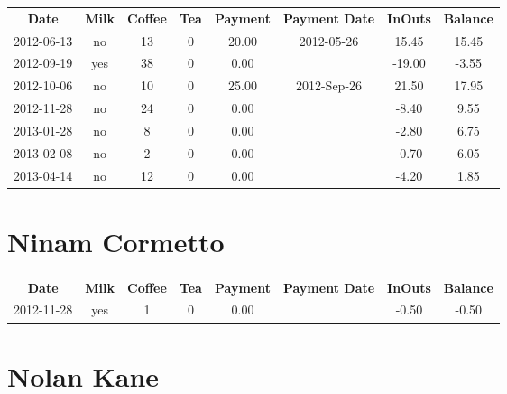 \begin{center}
\begin{tabular}{cccccccc}
\textbf{Date} & \textbf{Milk} & \textbf{Coffee} & \textbf{Tea} & \textbf{Payment} & \textbf{Payment Date} & \textbf{InOuts} & \textbf{Balance} \\
2012-06-13 & no & 13 & 0 & 20.00 & 2012-05-26 &  15.45 & 15.45\\ 
2012-09-19 & yes & 38 & 0 &  0.00 &  & -19.00 & -3.55\\ 
2012-10-06 & no & 10 & 0 & 25.00 & 2012-Sep-26 &  21.50 & 17.95\\ 
2012-11-28 & no & 24 & 0 &  0.00 &  &  -8.40 &  9.55\\ 
2013-01-28 & no &  8 & 0 &  0.00 &  &  -2.80 &  6.75\\ 
2013-02-08 & no &  2 & 0 &  0.00 &  &  -0.70 &  6.05\\ 
2013-04-14 & no & 12 & 0 &  0.00 &  &  -4.20 &  1.85
\end{tabular}
\end{center}

\section{Ninam Cormetto}

\begin{center}
\begin{tabular}{cccccccc}
\textbf{Date} & \textbf{Milk} & \textbf{Coffee} & \textbf{Tea} & \textbf{Payment} & \textbf{Payment Date} & \textbf{InOuts} & \textbf{Balance} \\
2012-11-28 & yes & 1 & 0 & 0.00 &  & -0.50 & -0.50
\end{tabular}
\end{center}

\section{Nolan Kane}

